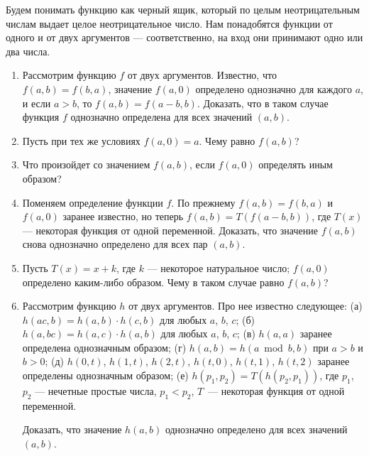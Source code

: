 ﻿

\ms Будем понимать функцию как черный ящик, который по целым неотрицательным числам выдает 
целое неотрицательное число. Нам понадобятся функции от одного и от двух аргументов --- 
соответственно, на вход они принимают одно или два числа.

\begin{enumerate}

\item Рассмотрим функцию $f$ от двух аргументов. Известно, что $f(a,b) = f(b,a)$, значение $f(a,0)$ определено однозначно для каждого $a$, и если $a>b$, то $f(a,b) = f(a-b,b)$. Доказать, что в таком случае функция $f$ однозначно определена для всех значений $(a,b)$.

\item Пусть при тех же условиях $f(a,0)=a$. Чему равно $f(a,b)$?

\item Что произойдет со значением $f(a,b)$, если $f(a,0)$ определять иным образом?

\item Поменяем определение функции $f$. По прежнему $f(a,b) = f(b,a)$ и $f(a,0)$ заранее известно, но теперь $f(a,b) = T(f(a-b,b))$, где $T(x)$ --- некоторая функция от одной переменной. Доказать, что значение $f(a,b)$ снова однозначно определено для всех пар $(a,b)$.

\item Пусть $T(x) = x+k$, где $k$ --- некоторое натуральное число; $f(a,0)$ определено каким-либо образом. Чему в таком случае равно $f(a,b)$?

\item Рассмотрим функцию $h$ от двух аргументов. Про нее известно следующее:
  \subitem (а) $h(ac,b) = h(a,b) \cdot h(c,b)$ для любых $a$, $b$, $c$;
  \subitem (б) $h(a,bc) = h(a,c) \cdot h(a,b)$ для любых $a$, $b$, $c$;
  \subitem (в) $h(a,a)$ заранее определена однозначным образом;
  \subitem (г) $h(a,b) = h(a \bmod b, b)$ при $a>b$ и $b>0$;
  \subitem (д) $h(0,t)$, $h(1,t)$, $h(2,t)$, $h(t,0)$, $h(t,1)$, $h(t,2)$ заранее определены однозначным образом;
  \subitem (е) $h(p_1,p_2) = T(h(p_2,p_1))$, где $p_1$, $p_2$ --- нечетные простые числа, $p_1<p_2$, $T$~--- некоторая функция от одной переменной.

\ms Доказать, что значение $h(a,b)$ однозначно определено для всех значений $(a,b)$.

\end{enumerate}